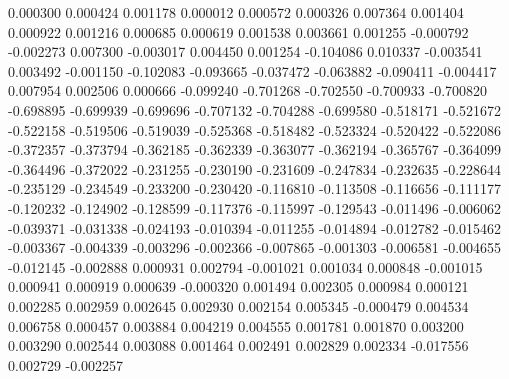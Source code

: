 0.000300
0.000424
0.001178
0.000012
0.000572
0.000326
0.007364
0.001404
0.000922
0.001216
0.000685
0.000619
0.001538
0.003661
0.001255
-0.000792
-0.002273
0.007300
-0.003017
0.004450
0.001254
-0.104086
0.010337
-0.003541
0.003492
-0.001150
-0.102083
-0.093665
-0.037472
-0.063882
-0.090411
-0.004417
0.007954
0.002506
0.000666
-0.099240
-0.701268
-0.702550
-0.700933
-0.700820
-0.698895
-0.699939
-0.699696
-0.707132
-0.704288
-0.699580
-0.518171
-0.521672
-0.522158
-0.519506
-0.519039
-0.525368
-0.518482
-0.523324
-0.520422
-0.522086
-0.372357
-0.373794
-0.362185
-0.362339
-0.363077
-0.362194
-0.365767
-0.364099
-0.364496
-0.372022
-0.231255
-0.230190
-0.231609
-0.247834
-0.232635
-0.228644
-0.235129
-0.234549
-0.233200
-0.230420
-0.116810
-0.113508
-0.116656
-0.111177
-0.120232
-0.124902
-0.128599
-0.117376
-0.115997
-0.129543
-0.011496
-0.006062
-0.039371
-0.031338
-0.024193
-0.010394
-0.011255
-0.014894
-0.012782
-0.015462
-0.003367
-0.004339
-0.003296
-0.002366
-0.007865
-0.001303
-0.006581
-0.004655
-0.012145
-0.002888
0.000931
0.002794
-0.001021
0.001034
0.000848
-0.001015
0.000941
0.000919
0.000639
-0.000320
0.001494
0.002305
0.000984
0.000121
0.002285
0.002959
0.002645
0.002930
0.002154
0.005345
-0.000479
0.004534
0.006758
0.000457
0.003884
0.004219
0.004555
0.001781
0.001870
0.003200
0.003290
0.002544
0.003088
0.001464
0.002491
0.002829
0.002334
-0.017556
0.002729
-0.002257
